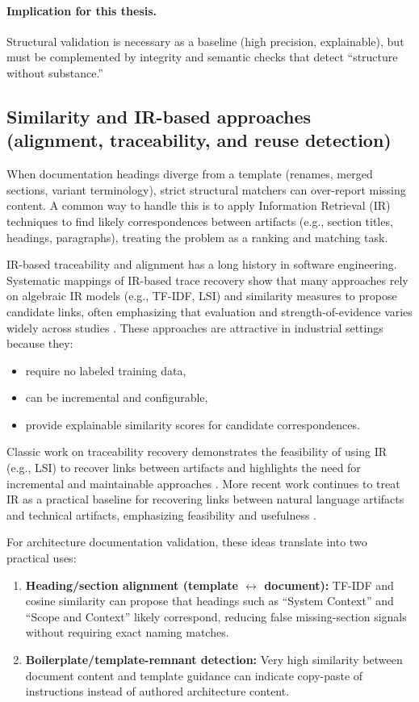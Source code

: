 \paragraph{Implication for this thesis.}
Structural validation is necessary as a baseline (high precision, explainable), but must be complemented by integrity and semantic checks that detect ``structure without substance.''

\subsection{Similarity and IR-based approaches (alignment, traceability, and reuse detection)}
When documentation headings diverge from a template (renames, merged sections, variant terminology), strict structural matchers can over-report missing content. A common way to handle this is to apply Information Retrieval (IR) techniques to find likely correspondences between artifacts (e.g., section titles, headings, paragraphs), treating the problem as a ranking and matching task.

IR-based traceability and alignment has a long history in software engineering. Systematic mappings of IR-based trace recovery show that many approaches rely on algebraic IR models (e.g., TF-IDF, LSI) and similarity measures to propose candidate links, often emphasizing that evaluation and strength-of-evidence varies widely across studies \cite{borg_traceability_mapping,cleland_huang_lsi_traceability}. These approaches are attractive in industrial settings because they:
\begin{itemize}
    \item require no labeled training data,
    \item can be incremental and configurable,
    \item provide explainable similarity scores for candidate correspondences.
\end{itemize}

Classic work on traceability recovery demonstrates the feasibility of using IR (e.g., LSI) to recover links between artifacts and highlights the need for incremental and maintainable approaches \cite{cleland_huang_lsi_traceability}. More recent work continues to treat IR as a practical baseline for recovering links between natural language artifacts and technical artifacts, emphasizing feasibility and usefulness \cite{recent_traceability_recovery}.

For architecture documentation validation, these ideas translate into two practical uses:
\begin{enumerate}
    \item \textbf{Heading/section alignment (template $\leftrightarrow$ document):} TF-IDF and cosine similarity can propose that headings such as ``System Context'' and ``Scope and Context'' likely correspond, reducing false missing-section signals without requiring exact naming matches.
    \item \textbf{Boilerplate/template-remnant detection:} Very high similarity between document content and template guidance can indicate copy-paste of instructions instead of authored architecture content.
\end{enumerate}

